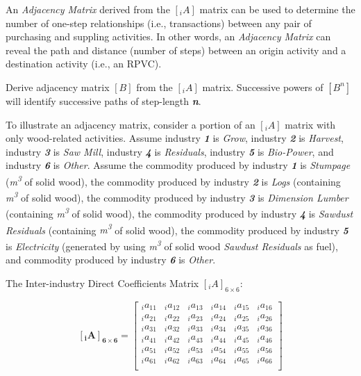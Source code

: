 \documentclass[
  letterpaper,
  DIV=11,
  numbers=noendperiod]{scrreprt}
\begin{document}
An \emph{Adjacency Matrix} derived from the \([_{i}A]\) matrix can be
used to determine the number of one-step relationships (i.e.,
transactions) between any pair of purchasing and suppling activities. In
other words, an \emph{Adjacency Matrix} can reveal the path and distance
(number of steps) between an origin activity and a destination activity
(i.e., an RPVC).

Derive adjacency matrix \([B]\) from the \([_{i}A]\) matrix. Successive
powers of \([B^{n}]\) will identify successive paths of step-length
\textbf{\emph{n}}.

To illustrate an adjacency matrix, consider a portion of an \([_{i}A]\)
matrix with only wood-related activities. Assume industry
\textbf{\emph{1}} is \emph{Grow}, industry \textbf{\emph{2}} is
\emph{Harvest}, industry \textbf{\emph{3}} is \emph{Saw Mill}, industry
\textbf{\emph{4}} is \emph{Residuals}, industry \textbf{\emph{5}} is
\emph{Bio-Power}, and industry \textbf{\emph{6}} is \emph{Other}. Assume
the commodity produced by industry \textbf{\emph{1}} is \emph{Stumpage}
(\emph{m\textsuperscript{3}} of solid wood), the commodity produced by
industry \textbf{\emph{2}} is \emph{Logs} (containing
\emph{m\textsuperscript{3}} of solid wood), the commodity produced by
industry \textbf{\emph{3}} is \emph{Dimension Lumber} (containing
\emph{m\textsuperscript{3}} of solid wood), the commodity produced by
industry \textbf{\emph{4}} is \emph{Sawdust Residuals} (containing
\emph{m\textsuperscript{3}} of solid wood), the commodity produced by
industry \textbf{\emph{5}} is \emph{Electricity} (generated by using
\emph{m\textsuperscript{3}} of solid wood \emph{Sawdust Residuals} as
fuel), and commodity produced by industry \textbf{\emph{6}} is
\emph{Other}.

The Inter-industry Direct Coefficients Matrix \([_{i}A]_{6\times 6}\):

\[\mathbf{[_{i}A]_{6\times 6}} = \left[\begin{array}
{rrr}
_{i}a_{11} & _{i}a_{12} & _{i}a_{13} & _{i}a_{14} & _{i}a_{15} & _{i}a_{16} \\
_{i}a_{21} & _{i}a_{22} & _{i}a_{23} & _{i}a_{24} & _{i}a_{25} & _{i}a_{26} \\
_{i}a_{31} & _{i}a_{32} & _{i}a_{33} & _{i}a_{34} & _{i}a_{35} & _{i}a_{36} \\
_{i}a_{41} & _{i}a_{42} & _{i}a_{43} & _{i}a_{44} & _{i}a_{45} & _{i}a_{46} \\
_{i}a_{51} & _{i}a_{52} & _{i}a_{53} & _{i}a_{54} & _{i}a_{55} & _{i}a_{56} \\
_{i}a_{61} & _{i}a_{62} & _{i}a_{63} & _{i}a_{64} & _{i}a_{65} & _{i}a_{66} \\
\end{array}\right]
\]
\end{document}
